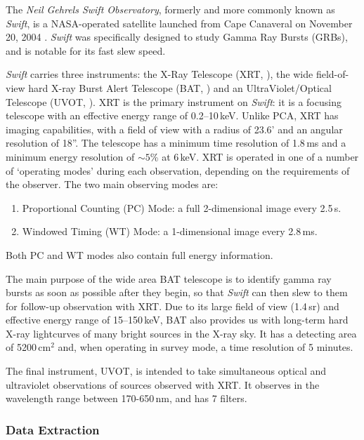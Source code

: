 \par The \textit{Neil Gehrels Swift Observatory}, formerly and more commonly known as \textit{Swift}, is a NASA-operated satellite launched from Cape Canaveral on November 20, 2004 \citep{Gehrels_Swift}.  \textit{Swift} was specifically designed to study Gamma Ray Bursts (GRBs), and is notable for its fast slew speed.
\par \textit{Swift} carries three instruments: the X-Ray Telescope (XRT, \citealp{Burrows_XRT}), the wide field-of-view hard X-ray Burst Alert Telescope (BAT, \citealp{Krimm_BAT}) and an UltraViolet/Optical Telescope (UVOT, \citealp{Roming_UVOT}).  XRT is the primary instrument on \textit{Swift}: it is a focusing telescope with an effective energy range of 0.2--10\,keV.  Unlike PCA, XRT has imaging capabilities, with a field of view with a radius of 23.6' and an angular resolution of 18''.  The telescope has a minimum time resolution of 1.8\,ms and a minimum energy resolution of $\sim5$\% at 6\,keV.  XRT is operated in one of a number of `operating modes' during each observation, depending on the requirements of the observer.  The two main observing modes are:
\begin{enumerate}
\item Proportional Counting (PC) Mode: a full 2-dimensional image every 2.5\,s.
\item Windowed Timing (WT) Mode: a 1-dimensional image every 2.8\,ms.
\end{enumerate}
Both PC and WT modes also contain full energy information.
\par The main purpose of the wide area BAT telescope is to identify gamma ray bursts as soon as possible after they begin, so that \textit{Swift} can then slew to them for follow-up observation with XRT.  Due to its large field of view (1.4\,sr) and effective energy range of 15--150\,keV, BAT also provides us with long-term hard X-ray lightcurves of many bright sources in the X-ray sky.  It has a detecting area of 5200\,cm$^2$ and, when operating in survey mode, a time resolution of 5 minutes.
\par The final instrument, UVOT, is intended to take simultaneous optical and ultraviolet observations of sources observed with XRT.  It observes in the wavelength range between 170-650\,nm, and has 7 filters.

\subsubsection{Data Extraction}

